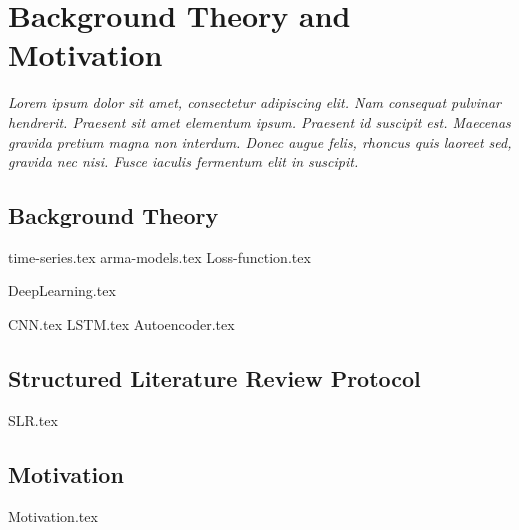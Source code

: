 \chapter{Background Theory and Motivation}\label{T-B}
\label{cha:TheoryAndBackground}

{\it Lorem ipsum dolor sit amet, consectetur adipiscing elit. Nam consequat pulvinar hendrerit. Praesent sit amet elementum ipsum. Praesent id suscipit est. Maecenas gravida pretium magna non interdum. Donec augue felis, rhoncus quis laoreet sed, gravida nec nisi. Fusce iaculis fermentum elit in suscipit.}



\section{Background Theory}
\label{sec:no1}
{time-series.tex}
{arma-models.tex}
{Loss-function.tex}

{DeepLearning.tex}

{CNN.tex}
{LSTM.tex}
{Autoencoder.tex}



\section{Structured Literature Review Protocol}
{SLR.tex}



\section{Motivation}
\label{sec:no2}
{Motivation.tex}
